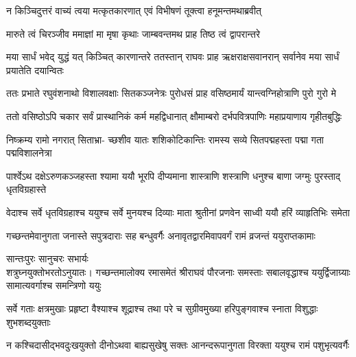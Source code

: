 \twolineshloka
{न किञ्चिदुत्तरं वाच्यं त्वया मत्कृतकारणात्}
{एवं विभीषणं तूक्त्वा हनूमन्तमथाब्रवीत्} %

\twolineshloka
{मारुते त्वं चिरञ्जीव ममाज्ञां मा मृषा कृथाः}
{जाम्बवन्तमथ प्राह तिष्ठ त्वं द्वापरान्तरे} %

\threelineshloka
{मया सार्धं भवेद् युद्धं यत् किञ्चित् कारणान्तरे}
{ततस्तान् राघवः प्राह ऋक्षराक्षसवानरान्}
{सर्वानेव मया सार्धं प्रयातेति दयान्वितः} %

\fourlineindentedshloka
{ततः प्रभाते रघुवंशनाथो}
{विशालवक्षाः सितकञ्जनेत्रः}
{पुरोधसं प्राह वसिष्ठमार्यं}
{यान्त्वग्निहोत्राणि पुरो गुरो मे} %

\fourlineindentedshloka
{ततो वसिष्ठोऽपि चकार सर्वं}
{प्रास्थानिकं कर्म महद्विधानात्}
{क्षौमाम्बरो दर्भपवित्रपाणिः}
{महाप्रयाणाय गृहीतबुद्धिः} %

\fourlineindentedshloka
{निष्क्रम्य रामो नगरात् सिताभ्रा-}
{च्छशीव यातः शशिकोटिकान्तिः}
{रामस्य सव्ये सितपद्महस्ता}
{पद्मा गता पद्मविशालनेत्रा} %

\fourlineindentedshloka
{पार्श्वेऽथ दक्षेऽरुणकञ्जहस्ता}
{श्यामा ययौ भूरपि दीप्यमाना}
{शास्त्राणि शस्त्राणि धनुश्च बाणा}
{जग्मुः पुरस्ताद् धृतविग्रहास्ते} %

\fourlineindentedshloka
{वेदाश्च सर्वे धृतविग्रहाश्च}
{ययुश्च सर्वे मुनयश्च दिव्याः}
{माता श्रुतीनां प्रणवेन साध्वी}
{ययौ हरिं व्याहृतिभिः समेता} %

\fourlineindentedshloka
{गच्छन्तमेवानुगता जनास्ते}
{सपुत्रदाराः सह बन्धुवर्गैः}
{अनावृतद्वारमिवापवर्गं}
{रामं व्रजन्तं ययुराप्तकामाः}%

\begin{minipage}{\linewidth}
\centering
{\hspace{-9ex}सान्तःपुरः\hspace{0.5ex} सानुचरः \hspace{0.5ex}सभार्यः}\\
{\hspace{-1ex}शत्रुघ्नयुक्तो\hspace{3ex}भरतोऽनुयातः।}
\fourlineindentedshloka
{गच्छन्तमालोक्य रमासमेतं}
{श्रीराघवं पौरजनाः समस्ताः}
{सबालवृद्धाश्च ययुर्द्विजाग्र्याः}
{सामात्यवर्गाश्च समन्त्रिणो ययुः} %
\end{minipage}

\fourlineindentedshloka
{सर्वे गताः क्षत्रमुखाः प्रहृष्टा}
{वैश्याश्च शूद्राश्च तथा परे च}
{सुग्रीवमुख्या हरिपुङ्गवाश्च}
{स्नाता विशुद्धाः शुभशब्दयुक्ताः} %

\fourlineindentedshloka
{न कश्चिदासीद्भवदुःखयुक्तो}
{दीनोऽथवा बाह्यसुखेषु सक्तः}
{आनन्दरूपानुगता विरक्ता}
{ययुश्च रामं पशुभृत्यवर्गैः} %

